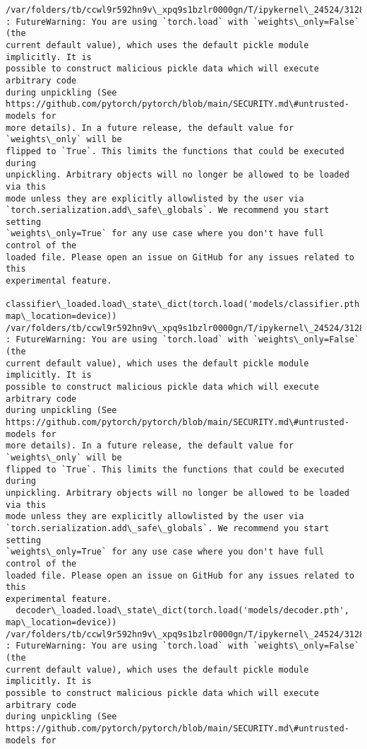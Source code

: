 \documentclass[11pt]{article}
\begin{document}
    \begin{Verbatim}[commandchars=\\\{\}]
/var/folders/tb/ccwl9r592hn9v\_xpq9s1bzlr0000gn/T/ipykernel\_24524/3128444424.py:4
: FutureWarning: You are using `torch.load` with `weights\_only=False` (the
current default value), which uses the default pickle module implicitly. It is
possible to construct malicious pickle data which will execute arbitrary code
during unpickling (See
https://github.com/pytorch/pytorch/blob/main/SECURITY.md\#untrusted-models for
more details). In a future release, the default value for `weights\_only` will be
flipped to `True`. This limits the functions that could be executed during
unpickling. Arbitrary objects will no longer be allowed to be loaded via this
mode unless they are explicitly allowlisted by the user via
`torch.serialization.add\_safe\_globals`. We recommend you start setting
`weights\_only=True` for any use case where you don't have full control of the
loaded file. Please open an issue on GitHub for any issues related to this
experimental feature.
  classifier\_loaded.load\_state\_dict(torch.load('models/classifier.pth',
map\_location=device))
/var/folders/tb/ccwl9r592hn9v\_xpq9s1bzlr0000gn/T/ipykernel\_24524/3128444424.py:5
: FutureWarning: You are using `torch.load` with `weights\_only=False` (the
current default value), which uses the default pickle module implicitly. It is
possible to construct malicious pickle data which will execute arbitrary code
during unpickling (See
https://github.com/pytorch/pytorch/blob/main/SECURITY.md\#untrusted-models for
more details). In a future release, the default value for `weights\_only` will be
flipped to `True`. This limits the functions that could be executed during
unpickling. Arbitrary objects will no longer be allowed to be loaded via this
mode unless they are explicitly allowlisted by the user via
`torch.serialization.add\_safe\_globals`. We recommend you start setting
`weights\_only=True` for any use case where you don't have full control of the
loaded file. Please open an issue on GitHub for any issues related to this
experimental feature.
  decoder\_loaded.load\_state\_dict(torch.load('models/decoder.pth',
map\_location=device))
/var/folders/tb/ccwl9r592hn9v\_xpq9s1bzlr0000gn/T/ipykernel\_24524/3128444424.py:9
: FutureWarning: You are using `torch.load` with `weights\_only=False` (the
current default value), which uses the default pickle module implicitly. It is
possible to construct malicious pickle data which will execute arbitrary code
during unpickling (See
https://github.com/pytorch/pytorch/blob/main/SECURITY.md\#untrusted-models for

\end{Verbatim}
\end{document}
